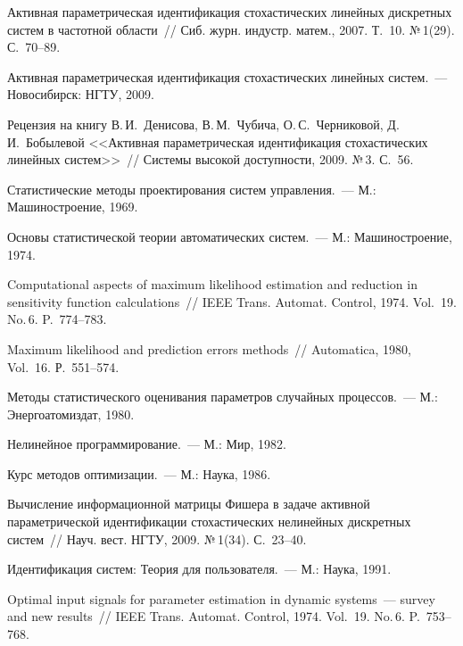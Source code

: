 \begin{multicols}{2}
{{\begin{thebibliography}{99}
Активная параметрическая идентификация стохастических линейных
дискретных систем в частотной области~// Сиб. журн. индустр. матем., 2007.
Т.~10. №\,1(29). С.~70--89.

Активная параметрическая идентификация стохастических линейных
сис\-тем.~--- Новосибирск: НГТУ, 2009.

Рецензия на книгу В.\,И.~Денисова, В.\,М.~Чубича, О.\,С.~Черниковой,
Д.\,И.~Бобылевой <<Активная параметрическая идентификация
стохастических линейных систем>>~// Системы высокой доступности, 2009.
№\,3. С.~56.

Статистические методы проектирования систем управления.~--- М.:
Машиностроение, 1969.

Основы статистической теории автоматических систем.~--- М.:
Машиностроение, 1974.

Computational aspects of maximum likelihood estimation and reduction in sensitivity
function calculations~// IEEE Trans. Automat. Control, 1974. Vol.~19. No.\,6.
P.~774--783.

Maximum likelihood and prediction errors methods~// Automatica, 1980,
Vol.~16. Р.~551--574.

 Методы статистического оценивания параметров
случайных процессов.~--- М.: Энергоатомиздат, 1980.

Нелинейное программирование.~--- М.: Мир, 1982.

Курс методов оптимизации.~--- М.: Наука, 1986.

Вычисление информационной матрицы Фишера в задаче активной
параметрической идентификации стохастических нелинейных дискретных
систем~// Науч. вест. НГТУ, 2009. №\,1(34). С.~23--40.

Идентификация систем: Теория для пользователя.~--- М.: Наука, 1991.

 \label{end\stat}

Optimal input signals for parameter estimation in dynamic systems~--- survey and
new results~// IEEE Trans. Automat. Control, 1974. Vol.~19. No.\,6.
P.~753--768.
 \end{thebibliography}
}
}


\end{multicols}